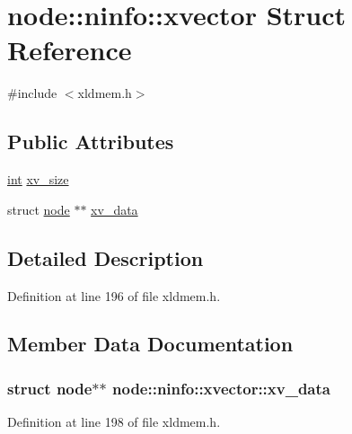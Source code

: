 \hypertarget{structnode_1_1ninfo_1_1xvector}{}\section{node\+:\+:ninfo\+:\+:xvector Struct Reference}
\label{structnode_1_1ninfo_1_1xvector}


{\ttfamily \#include $<$xldmem.\+h$>$}

\subsection*{Public Attributes}
\begin{DoxyCompactItemize}
\item 
\hyperlink{xmltok_8h_a5a0d4a5641ce434f1d23533f2b2e6653}{int} \hyperlink{structnode_1_1ninfo_1_1xvector_aec898be5b4f562fa5c0d996f88b3eedd}{xv\+\_\+size}
\item 
struct \hyperlink{structnode}{node} $\ast$$\ast$ \hyperlink{structnode_1_1ninfo_1_1xvector_a2650e984f31beb0c5878f1f6e2f1e88b}{xv\+\_\+data}
\end{DoxyCompactItemize}


\subsection{Detailed Description}


Definition at line 196 of file xldmem.\+h.



\subsection{Member Data Documentation}
\subsubsection[{\texorpdfstring{xv\+\_\+data}{xv_data}}]{\setlength{\rightskip}{0pt plus 5cm}struct {\bf node}$\ast$$\ast$ node\+::ninfo\+::xvector\+::xv\+\_\+data}\hypertarget{structnode_1_1ninfo_1_1xvector_a2650e984f31beb0c5878f1f6e2f1e88b}{}\label{structnode_1_1ninfo_1_1xvector_a2650e984f31beb0c5878f1f6e2f1e88b}


Definition at line 198 of file xldmem.\+h.

